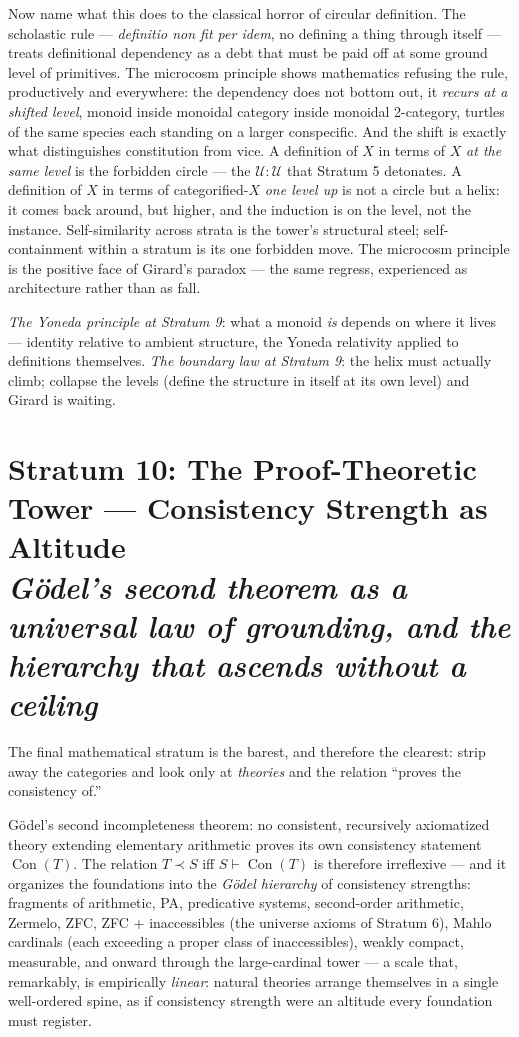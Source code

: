 \documentclass[11pt]{article}
\theoremstyle{plain}
\theoremstyle{definition}
\theoremstyle{remark}
\newcommand{\Con}{\operatorname{Con}}
\newcommand{\U}{\mathcal{U}}
\newcommand{\stratum}[2]{\section{#1 \\ {\normalsize\normalfont\itshape #2}}}
\begin{document}
Now name what this does to the classical horror of circular definition. The scholastic rule --- \emph{definitio non fit per idem}, no defining a thing through itself --- treats definitional dependency as a debt that must be paid off at some ground level of primitives. The microcosm principle shows mathematics refusing the rule, productively and everywhere: the dependency does not bottom out, it \emph{recurs at a shifted level}, monoid inside monoidal category inside monoidal 2-category, turtles of the same species each standing on a larger conspecific. And the shift is exactly what distinguishes constitution from vice. A definition of $X$ in terms of $X$ \emph{at the same level} is the forbidden circle --- the $\U : \U$ that Stratum 5 detonates. A definition of $X$ in terms of categorified-$X$ \emph{one level up} is not a circle but a helix: it comes back around, but higher, and the induction is on the level, not the instance. Self-similarity across strata is the tower's structural steel; self-containment within a stratum is its one forbidden move. The microcosm principle is the positive face of Girard's paradox --- the same regress, experienced as architecture rather than as fall.

\begin{refrain}
\emph{The Yoneda principle at Stratum 9}: what a monoid \emph{is} depends on where it lives --- identity relative to ambient structure, the Yoneda relativity applied to definitions themselves. \emph{The boundary law at Stratum 9}: the helix must actually climb; collapse the levels (define the structure in itself at its own level) and Girard is waiting.
\end{refrain}

\stratum{Stratum 10: The Proof-Theoretic Tower --- Consistency Strength as Altitude}{G\"odel's second theorem as a universal law of grounding, and the hierarchy that ascends without a ceiling}

The final mathematical stratum is the barest, and therefore the clearest: strip away the categories and look only at \emph{theories} and the relation ``proves the consistency of.''

G\"odel's second incompleteness theorem: no consistent, recursively axiomatized theory extending elementary arithmetic proves its own consistency statement $\Con(T)$. The relation $T \prec S$ iff $S \vdash \Con(T)$ is therefore irreflexive --- and it organizes the foundations into the \emph{G\"odel hierarchy} of consistency strengths: fragments of arithmetic, PA, predicative systems, second-order arithmetic, Zermelo, ZFC, ZFC + inaccessibles (the universe axioms of Stratum 6), Mahlo cardinals (each exceeding a proper class of inaccessibles), weakly compact, measurable, and onward through the large-cardinal tower --- a scale that, remarkably, is empirically \emph{linear}: natural theories arrange themselves in a single well-ordered spine, as if consistency strength were an altitude every foundation must register.
\end{document}

